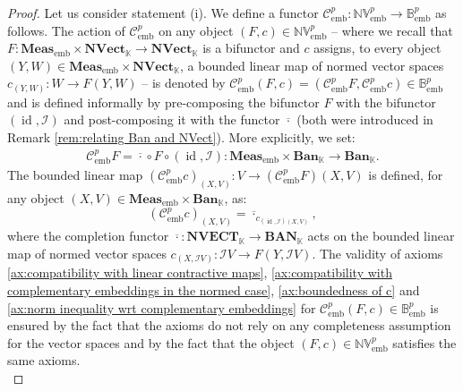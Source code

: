 \documentclass{amsart}
\theoremstyle{definition}
\theoremstyle{plain}
\newcommand{\id}{\operatorname{id}}
\newcommand{\embMeas}{\mathbf{Meas}_\mathrm{emb}}
\newcommand{\NVect}{\mathbf{NVect}_{\mathbb{K}}}
\newcommand{\NVECT}{\mathbf{NVECT}_{\mathbb{K}}}
\newcommand{\NVembp}{\mathbb{NV}_{\mathrm{emb}}^p}
\newcommand{\Ban}{\mathbf{Ban}_{\mathbb{K}}}
\newcommand{\BAN}{\mathbf{BAN}_{\mathbb{K}}}
\newcommand{\Bembp}{\mathbb{B}_{\mathrm{emb}}^p}
\begin{document}
        \begin{proof}
            Let us consider statement (i).
            We define a functor $\mathcal{C}_{\mathrm{emb}}^p \colon \NVembp \rightarrow \Bembp$ as follows. 
            The action of $\mathcal{C}_{\mathrm{emb}}^p$ on any object $(F,c) \in \NVembp$ -- where we recall that $F \colon \embMeas \times \NVect \rightarrow \NVect$ is a bifunctor and $c$ assigns, to every object $(Y,W) \in \embMeas \times \NVect$, a bounded linear map of normed vector spaces $c_{(Y,W)} \colon W \rightarrow F(Y,W)$ -- is denoted by $\mathcal{C}_{\mathrm{emb}}^p(F,c) = \left( \mathcal{C}_{\mathrm{emb}}^pF,\mathcal{C}_{\mathrm{emb}}^pc \right) \in \Bembp$ and is defined informally by pre-composing the bifunctor $F$ with the bifunctor $(\id,\mathcal{I})$ and post-composing it with the functor $\overline{\cdot}$ (both were introduced in Remark \ref{rem:relating Ban and NVect}). More explicitly, we set:
            \begin{equation}
            \label{eq:definition of the functor Cembp}
                \begin{split}
                    \mathcal{C}_{\mathrm{emb}}^pF = \overline{\cdot} \circ F \circ (\id,\mathcal{I}) \colon \embMeas \times \Ban \rightarrow \Ban.
                \end{split}
            \end{equation}
            The bounded linear map $\left( \mathcal{C}_{\mathrm{emb}}^pc \right)_{(X,V)} \colon V \rightarrow \left( \mathcal{C}_{\mathrm{emb}}^pF \right)(X,V)$ is defined, for any object $(X,V) \in \embMeas \times \Ban$, as: 
            \begin{equation}
            \label{eq:action of Cembp on c}
                \left( \mathcal{C}_{\mathrm{emb}}^pc \right)_{(X,V)} = \overline{\cdot}_{c_{(\id,\mathcal{I})(X,V)}}, 
            \end{equation}
            where the completion functor $\overline{\cdot} \colon \NVECT \rightarrow \BAN$ acts on the bounded linear map of normed vector spaces $c_{(X,\mathcal{I}V)} \colon \mathcal{I}V \rightarrow F\left( Y,\mathcal{I}V \right)$.
            The validity of axioms \ref{ax:compatibility with linear contractive maps}, \ref{ax:compatibility with complementary embeddings in the normed case}, \ref{ax:boundedness of c} and \ref{ax:norm inequality wrt complementary embeddings} for $\mathcal{C}_{\mathrm{emb}}^p(F,c) \in \Bembp$ is ensured by the fact that the axioms do not rely on any completeness assumption for the vector spaces and by the fact that the object $(F,c) \in \NVembp$ satisfies the same axioms. \\

\end{proof}
\end{document}
